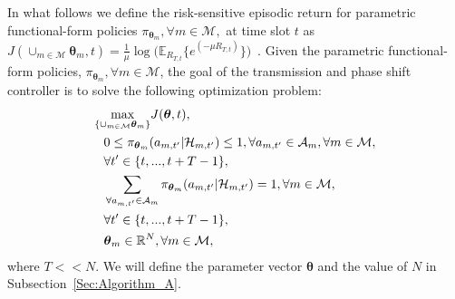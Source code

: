\documentclass[conference]{IEEEtran}
\begin{document}
In what follows we define the risk-sensitive episodic return for parametric functional-form policies $\pi_{\boldsymbol{\theta}_m},\forall m\in \mathcal{M},$ at time slot $t$ as $J(\cup_{m \in \mathcal{M}} \boldsymbol{\theta}_m ,t) =\frac{1}{\mu} \log\big( \mathbb{E}_{R_{T,t}} \{e^{(-\mu R_{T,t})}\} \big)$~\cite{four}. Given the parametric functional-form policies, $\pi_{\boldsymbol{\theta}_m},\forall m\in \mathcal{M}$, the goal of the transmission and phase shift controller is to solve the following optimization problem:
\begin{align}
& \underset{\left\{
\substack{ \cup_{m \in \mathcal{M}} \boldsymbol{\theta}_m }
\right\}}
\max J(\boldsymbol{\theta},t), \\
& \hspace{0.1in} 0\leq \pi_{\boldsymbol{\theta}_m}(a_{m,t'}|\mathcal{H}_{m,t'}) \leq 1, \forall a_{m,t'} \in \mathcal{A}_m,\forall m \in\mathcal{M},
\\ \nonumber
& \hspace{0.1in} \forall t' \in \{t,...,t+T-1\},\\
& \hspace{0.1in} \sum_{\forall a_{m,t'} \in \mathcal{A}_m} \pi_{\boldsymbol{\theta}_m}(a_{m,t'}|\mathcal{H}_{m,t'}) = 1, \forall m \in \mathcal{M},
\\ \nonumber
& \hspace{0.1in} \forall t' \in \{t,...,t+T-1\},\\
&  \hspace{0.1in} \boldsymbol{\theta}_m \in \mathbb{R}^{N}, \forall m \in \mathcal{M},
\label{Opt_prob_2}
\end{align}
where $T<<N$. We will define the parameter vector $\boldsymbol{\theta}$ and the value of $N$ in Subsection~\ref{Sec:Algorithm_A}.
\end{document}
